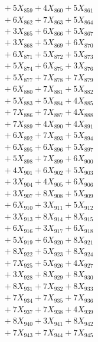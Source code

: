 \documentclass[a4paper,10pt]{article}
\begin{document}
{\begin{align}
&\;  + 5 X_{859} + 4 X_{860} + 5 X_{861} \\[0.3ex]
&\;  + 6 X_{862} + 7 X_{863} + 5 X_{864} \\[0.3ex]
&\;  + 3 X_{865} + 6 X_{866} + 5 X_{867} \\[0.3ex]
&\;  + 3 X_{868} + 5 X_{869} + 6 X_{870} \\[0.3ex]
&\;  + 6 X_{871} + 5 X_{872} + 5 X_{873} \\[0.3ex]
&\;  + 5 X_{874} + 6 X_{875} + 3 X_{876} \\[0.3ex]
&\;  + 5 X_{877} + 7 X_{878} + 7 X_{879} \\[0.5ex]\allowbreak
&\;  + 6 X_{880} + 7 X_{881} + 5 X_{882} \\[0.3ex]
&\;  + 5 X_{883} + 5 X_{884} + 4 X_{885} \\[0.3ex]
&\;  + 7 X_{886} + 7 X_{887} + 4 X_{888} \\[0.3ex]
&\;  + 7 X_{889} + 4 X_{890} + 4 X_{891} \\[0.3ex]
&\;  + 6 X_{892} + 7 X_{893} + 5 X_{894} \\[0.3ex]
&\;  + 6 X_{895} + 6 X_{896} + 5 X_{897} \\[0.3ex]
&\;  + 5 X_{898} + 7 X_{899} + 6 X_{900} \\[0.3ex]
&\;  + 4 X_{901} + 6 X_{902} + 5 X_{903} \\[0.3ex]
&\;  + 3 X_{904} + 4 X_{905} + 6 X_{906} \\[0.3ex]
&\;  + 3 X_{907} + 8 X_{908} + 5 X_{909} \\[0.5ex]\allowbreak
&\;  + 6 X_{910} + 3 X_{911} + 5 X_{912} \\[0.3ex]
&\;  + 3 X_{913} + 8 X_{914} + 8 X_{915} \\[0.3ex]
&\;  + 6 X_{916} + 3 X_{917} + 6 X_{918} \\[0.3ex]
&\;  + 5 X_{919} + 6 X_{920} + 8 X_{921} \\[0.3ex]
&\;  + 8 X_{922} + 5 X_{923} + 8 X_{924} \\[0.3ex]
&\;  + 7 X_{925} + 5 X_{926} + 4 X_{927} \\[0.3ex]
&\;  + 3 X_{928} + 8 X_{929} + 8 X_{930} \\[0.3ex]
&\;  + 8 X_{931} + 7 X_{932} + 8 X_{933} \\[0.3ex]
&\;  + 7 X_{934} + 7 X_{935} + 7 X_{936} \\[0.3ex]
&\;  + 7 X_{937} + 7 X_{938} + 4 X_{939} \\[0.5ex]\allowbreak
&\;  + 8 X_{940} + 3 X_{941} + 8 X_{942} \\[0.3ex]
&\;  + 7 X_{943} + 7 X_{944} + 7 X_{945} \\[0.3ex]

\end{align}}
\end{document}
